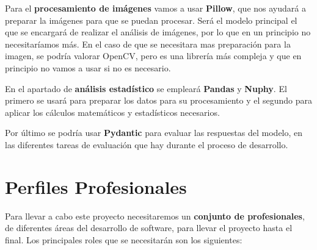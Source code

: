Para el \textbf{procesamiento de imágenes} vamos a usar \textbf{Pillow}, que nos ayudará a preparar la imágenes para que se puedan procesar. Será el modelo principal el que se encargará de realizar el análisis de imágenes, por lo que en un principio no necesitaríamos más. En el caso de que se necesitara mas preparación para la imagen, se podría valorar OpenCV, pero es una librería más compleja y que en principio no vamos a usar si no es necesario. 

En el apartado de \textbf{análisis estadístico} se empleará \textbf{Pandas} y \textbf{Nuphy}. El primero se usará para preparar los datos para su procesamiento y el segundo para aplicar los cálculos matemáticos y estadísticos necesarios.

Por último se podría usar \textbf{Pydantic} para evaluar las respuestas del modelo, en las diferentes tareas de evaluación que hay durante el proceso de desarrollo.
             
\section{Perfiles Profesionales}
Para llevar a cabo este proyecto necesitaremos un \textbf{conjunto de profesionales}, de diferentes áreas del desarrollo de software, para llevar el proyecto hasta el final. Los principales roles que se necesitarán son los siguientes: 

